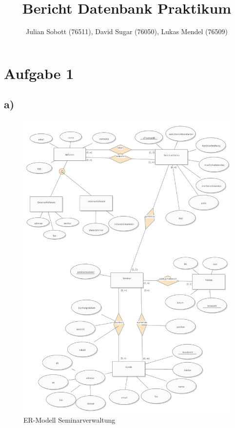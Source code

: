 \documentclass[10pt,a4paper]{article}
\author{Julian Sobott (76511), David Sugar (76050), Lukas Mendel (76509)}
\title{Bericht Datenbank Praktikum}
\begin{document}
\maketitle
\tableofcontents

\newpage
\section{Aufgabe 1}
\subsection{a)}


\begin{figure}[ht!]
	\includegraphics[scale=0.2]{Bilder/ER-Modell.PNG}
	\caption{ER-Modell Seminarverwaltung}
	\label{er:1}
\end{figure}
\newpage
\end{document}
